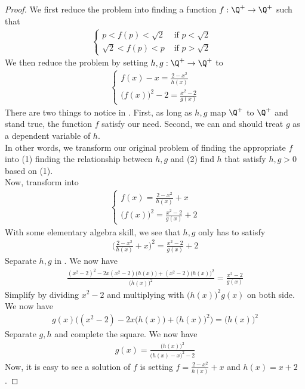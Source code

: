 \documentclass{report}
\begin{document}
\begin{proof}
We first reduce the problem into finding a function $f:\Q^+\rightarrow \Q^+$ such that 
\begin{align*}
\begin{cases}
  p<f(p)<\sqrt{2}& \text{ if $p<\sqrt{2} $ }\\
  \sqrt{2} <f(p)<p & \text{ if $p>\sqrt{2} $ }
\end{cases}
\end{align*}
We then reduce the problem by setting $h,g:\Q^+\rightarrow \Q^+$ to 
\begin{align}
\label{1.3}
\begin{cases}
  f(x)-x=\frac{2-x^2}{h(x)}\\
  \big(f(x) \big)^2-2=\frac{x^2-2}{g(x)}
\end{cases}
\end{align}
There are two things to notice in . First, as long as $h,g$ map $\Q^+$ to  $\Q^+$ and  stand true, the function  $f$ satisfy our need. Second, we can and should treat $g$ as a dependent variable of $h$.\\

In other words, we transform our original problem of finding the appropriate $f$ into (1) finding the relationship between $h,g$ and (2) find $h$ that satisfy $h,g>0$ based on (1).\\

Now, transform  into
\begin{align}
\label{1.4}
\begin{cases}
  f(x)=\frac{2-x^2}{h(x)}+x\\
  \big(f(x) \big)^2=\frac{x^2-2}{g(x)}+2
\end{cases}
\end{align}
With some elementary algebra skill, we see that $h,g$ only has to satisfy    
 \begin{align}
\label{1.5}
\Big(\frac{2-x^2}{h(x)}+x \Big)^2=\frac{x^2-2}{g(x)}+2
\end{align}
Separate $h,g$ in . We now have 
\begin{align}
\label{1.6}
\frac{(x^2-2)^2-2x(x^2-2)\big(h(x)\big)+(x^2-2)\big(h(x)\big)^2}{\big(h(x)\big)^2}=\frac{x^2-2}{g(x)}
\end{align}
Simplify  by dividing $x^2-2$ and multiplying with $\big(h(x)\big)^2g(x)$ on both side. We now have 
\begin{align*}
g(x)\Big((x^2-2)-2x\big(h(x) \big)+\big(h(x) \big)^2\Big)=\big(h(x) \big)^2
\end{align*}
Separate $g,h$ and complete the square. We now have 
\begin{align}
\label{1.7}
g(x)=\frac{\big(h(x) \big)^2}{\big(h(x)-x \big)^2-2}
\end{align}
Now, it is easy to see a solution of $f$ is setting $f=\frac{2-x^2}{h(x)}+x$ and $h(x)=x+2$. 
\end{proof}
\end{document}
